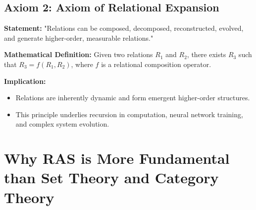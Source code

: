 \documentclass[a4paper,12pt]{article}
\begin{document}
\subsection{Axiom 2: Axiom of Relational Expansion}
\textbf{Statement:} "Relations can be composed, decomposed, reconstructed, evolved, and generate higher-order, measurable relations."

\textbf{Mathematical Definition:} Given two relations \( R_1 \) and \( R_2 \), there exists \( R_3 \) such that \( R_3 = f(R_1, R_2) \), where \( f \) is a relational composition operator.

\textbf{Implication:}
\begin{itemize}
    \item Relations are inherently dynamic and form emergent higher-order structures.
    \item This principle underlies recursion in computation, neural network training, and complex system evolution.
\end{itemize}

\section{Why RAS is More Fundamental than Set Theory and Category Theory}

\begin{table}[H]
\centering
\renewcommand{\arraystretch}{1.2}
\setlength{\tabcolsep}{6pt}
\caption{Comparison of RAS with existing mathematical frameworks.}
\label{table:comparison}
\end{table}
\end{document}
